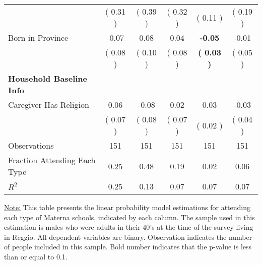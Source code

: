 \begin{table}[H]
{\begin{tabular}{lccccc}
\quad  & (     0.31 ) & (     0.39 )  & (     0.32 )  & (     0.11 ) & (     0.19 ) \\
\quad Born in Province &     -0.07 &      0.08 &      0.04 & \textbf{    -0.05} &     -0.01 \\
\quad  & (     0.08 ) & (     0.10 )  & (     0.08 )  & \textbf{(     0.03 )} & (     0.05 ) \\
\midrule
\textbf{Household Baseline Info} \\
\quad Caregiver Has Religion &      0.06 &     -0.08 &      0.02 &      0.03 &     -0.03 \\
\quad  & (     0.07 ) & (     0.08 )  & (     0.07 )  & (     0.02 ) & (     0.04 ) \\
\midrule
Observations & 151 & 151 & 151 & 151 & 151 \\
Fraction Attending Each Type &      0.25 &      0.48 &      0.19 &      0.02 &      0.06 \\
\midrule
$ R^2$ &      0.25 &      0.13 &      0.07 &      0.07 &      0.07 \\
\bottomrule
\end{tabular}}
\end{table}
\begin{footnotesize}
\noindent\underline{Note:} This table presents the linear probability model estimations for attending each type of Materna schools, indicated by each column. The sample used in this estimation is males who were adults in their 40's at the time of the survey living in Reggio. All dependent variables are binary. Observation indicates the number of people included in this sample. Bold number indicates that the p-value is less than or equal to 0.1.
\end{footnotesize}
